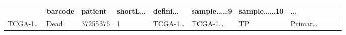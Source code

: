 \documentclass[
]{article}
\begin{document}
\begin{longtable}[]{@{}lllllllllll@{}}
\begin{minipage}[b]{0.07\columnwidth}
\end{minipage} & \begin{minipage}[b]{0.07\columnwidth}\raggedright
barcode\strut
\end{minipage} & \begin{minipage}[b]{0.07\columnwidth}\raggedright
patient\strut
\end{minipage} & \begin{minipage}[b]{0.07\columnwidth}\raggedright
shortL\ldots{}\strut
\end{minipage} & \begin{minipage}[b]{0.07\columnwidth}\raggedright
defini\ldots{}\strut
\end{minipage} & \begin{minipage}[b]{0.09\columnwidth}\raggedright
sample\ldots\ldots9\strut
\end{minipage} & \begin{minipage}[b]{0.10\columnwidth}\raggedright
sample\ldots\ldots10\strut
\end{minipage} & \begin{minipage}[b]{0.03\columnwidth}\raggedright
\ldots{}\strut
\end{minipage}\tabularnewline
\midrule
\endhead
\begin{minipage}[t]{0.07\columnwidth}\raggedright
TCGA-1\ldots{}\strut
\end{minipage} & \begin{minipage}[t]{0.04\columnwidth}\raggedright
Dead\strut
\end{minipage} & \begin{minipage}[t]{0.06\columnwidth}\raggedright
37255376\strut
\end{minipage} & \begin{minipage}[t]{0.07\columnwidth}\raggedright
1\strut
\end{minipage} & \begin{minipage}[t]{0.07\columnwidth}\raggedright
TCGA-1\ldots{}\strut
\end{minipage} & \begin{minipage}[t]{0.07\columnwidth}\raggedright
TCGA-1\ldots{}\strut
\end{minipage} & \begin{minipage}[t]{0.07\columnwidth}\raggedright
TP\strut
\end{minipage} & \begin{minipage}[t]{0.07\columnwidth}\raggedright
Primar\ldots{}\strut
\end{minipage} & \begin{minipage}[t]{0.09\columnwidth}\raggedright

\end{minipage}
\end{longtable}
\end{document}

